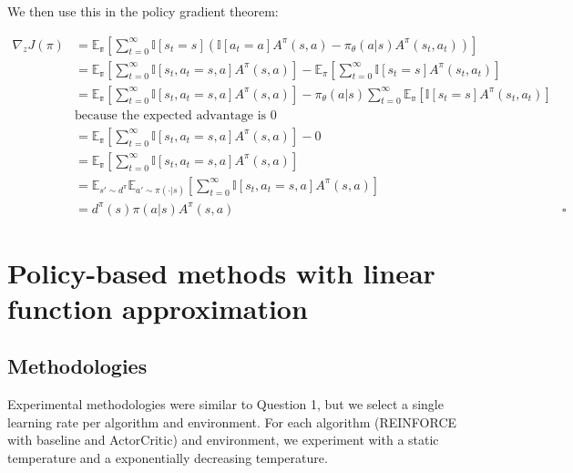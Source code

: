 \documentclass{article}
\newcommand{\grad}{\nabla}
\begin{document}
We then use this in the policy gradient theorem:

\begin{align*}
  \grad_z J(\pi) &= \mathbb{E_\pi} \left [ \sum_{t=0}^\infty \mathbb{I}[ s_t = s] \left ( \mathbb{I}[a_t = a] A^{\pi}(s,a) - \pi_\theta(a|s)A^{\pi} (s_t, a_t) \right) \right]\\
                 &= \mathbb{E_\pi} \left [ \sum_{t=0}^\infty \mathbb{I}[s_t, a_t = s, a] A^\pi (s,a) \right] - \mathbb{E}_\pi \left [ \sum _{t=0}^{\infty} \mathbb{I} [s_t = s] A^{\pi} (s_t, a_t)\right]\\
                 &= \mathbb{E_\pi} \left [ \sum_{t=0}^\infty \mathbb{I}[s_t, a_t = s, a] A^\pi (s,a) \right] - \pi_\theta(a|s) \sum_{t=0}^\infty \mathbb{E_\pi} [\mathbb{I}[s_t = s] A^\pi (s_t, a_t)]\\
                 &\text{because the expected advantage is 0}\\
                 &= \mathbb{E_\pi} \left [ \sum_{t=0}^\infty \mathbb{I}[s_t, a_t = s, a] A^\pi (s,a) \right] - 0 \\
                 &= \mathbb{E_\pi} \left [ \sum_{t=0}^\infty \mathbb{I}[s_t, a_t = s, a] A^\pi (s,a) \right]\\
                 &= \mathbb{E}_{s' \sim d^\pi} \mathbb{E}_{a' \sim \pi(\cdot | s)} \left [ \sum_{t=0}^\infty \mathbb{I}[s_t, a_t = s, a] A^\pi (s,a) \right]\\
                 &= d^\pi(s) \pi(a|s) A^\pi(s,a) &\square
\end{align*}












\section{Policy-based methods with linear function approximation}

\subsection{Methodologies}

Experimental methodologies were similar to Question 1, but we select a single learning rate per
algorithm and environment. For each algorithm (REINFORCE with baseline and ActorCritic) and environment, we experiment with a static temperature and a
exponentially decreasing temperature.
\end{document}
